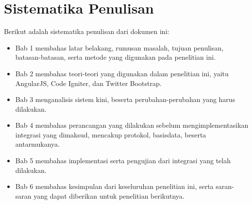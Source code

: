 \section{Sistematika Penulisan}
\label{sec: sistematikaPenulisan}

Berikut adalah sistematika penulisan dari dokumen ini:

\begin{itemize}
	\item Bab 1 membahas latar belakang, rumusan masalah, tujuan penulisan, batasan-batasan, serta metode yang digunakan pada penelitian ini.
	\item Bab 2 membahas teori-teori yang digunakan dalam penelitian ini, yaitu AngularJS, Code Igniter, dan Twitter Bootstrap.
	\item Bab 3 menganalisis sistem kini, beserta perubahan-perubahan yang harus dilakukan.
	\item Bab 4 membahas perancangan yang dilakukan sebelum mengimplementasikan integrasi yang dimaksud, mencakup protokol, basisdata, beserta antarmukanya.
	\item Bab 5 membahas implementasi serta pengujian dari integrasi yang telah dilakukan.
	\item Bab 6 membahas kesimpulan dari keseluruhan penelitian ini, serta saran-saran yang dapat diberikan untuk penelitian berikutnya.
\end{itemize}